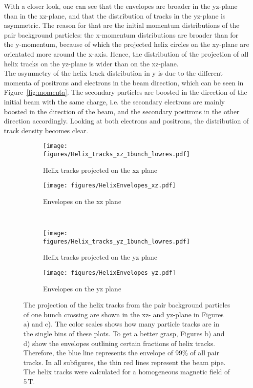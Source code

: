 With a closer look, one can see that the envelopes are broader in the yz-plane than in the xz-plane, and that the distribution of tracks in the yz-plane is asymmetric.
The reason for that are the initial momentum distributions of the pair background particles: the x-momentum distributions are broader than for the y-momentum, because of which the projected helix circles on the xy-plane are orientated more around the x-axis.
Hence, the distribution of the projection of all helix tracks on the yz-plane is wider than on the xz-plane.\\
The asymmetry of the helix track distribution in y is due to the different momenta of positrons and electrons in the beam direction, which can be seen in Figure~\ref{fig:momenta}.
The secondary particles are boosted in the direction of the initial beam with the same charge, i.e. the secondary electrons are mainly boosted in the direction of the \Pem beam, and the secondary positrons in the other direction accordingly.
Looking at both electrons and positrons, the distribution of track density becomes clear.


\begin{figure}
    \centering
    \begin{subfigure}[b]{0.49\textwidth}
    \centering
        \texttt{[image: figures/Helix\_tracks\_xz\_1bunch\_lowres.pdf]}
        \caption{Helix tracks projected on the xz plane}
	\label{fig:helix_xz}
    \end{subfigure}
    \begin{subfigure}[b]{0.49\textwidth}
    \centering
        \texttt{[image: figures/HelixEnvelopes\_xz.pdf]}
        \caption{Envelopes on the xz plane}
        \label{fig:envelopes_xz}
    \end{subfigure}\\
    \begin{subfigure}[b]{0.49\textwidth}
    \centering
        \texttt{[image: figures/Helix\_tracks\_yz\_1bunch\_lowres.pdf]}
        \caption{Helix tracks projected on the yz plane}
	\label{fig:helix_yz}
    \end{subfigure}
    \begin{subfigure}[b]{0.49\textwidth}
    \centering
        \texttt{[image: figures/HelixEnvelopes\_yz.pdf]}
        \caption{Envelopes on the yz plane}
        \label{fig:envelopes_yz}
    \end{subfigure}
    \caption[Helix tracks and their envelopes]{
    The projection of the helix tracks from the pair background particles of one bunch crossing are shown in the xz- and yz-plane in Figures a) and c).
    The color scales shows how many particle tracks are in the single bins of these plots.
    To get a better grasp, Figures b) and d) show the envelopes outlining certain fractions of helix tracks.
    Therefore, the blue line represents the envelope of 99\% of all pair tracks.
    In all subfigures, the thin red lines represent the beam pipe.
    The helix tracks were calculated for a homogeneous magnetic field of \unit{5}\,{T}.
    }
    \label{fig:Helixes}
\end{figure}

